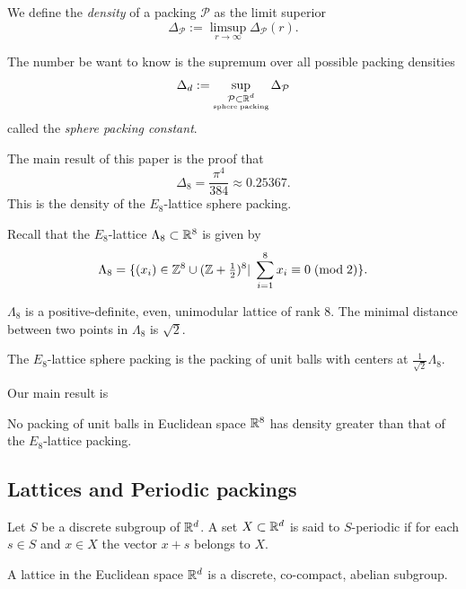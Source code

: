   \begin{definition} We define the \emph{density} of a packing $\mathcal{P}$ as the limit superior
  $$\Delta_{\mathcal{P}}:=\limsup\limits_{r\to\infty}\Delta_{\mathcal{P}}(r). $$
  \end{definition}

  \begin{definition}
  The number be want to know is the supremum over all possible packing densities
  $$\Delta_d:=\sup\limits_{\substack{\mathcal{P}\subset\mathbb{R}^d\\ \scriptscriptstyle\mathrm{sphere}\;\mathrm{packing}}}\Delta_{\mathcal{P}} $$
  called the \emph{sphere packing constant}.
  \end{definition}

  The main result of this paper is the proof that $$\Delta_8=\frac{\pi^4}{384}\approx 0.25367.$$
  This is the density of the $E_8$-lattice sphere packing.
  \begin{definition}Recall that the $E_8$-lattice $\Lambda_8\subset\mathbb{R}^8$ is given by
  $$\Lambda_8=\{(x_i)\in\mathbb{Z}^8\cup(\mathbb{Z}+\textstyle\frac12\displaystyle )^8|\;\sum_{i=1}^8x_i\equiv 0\;(\mathrm{mod\;2})\}.$$
  \end{definition}
  \begin{lemma}$\Lambda_8$ is a positive-definite, even, unimodular lattice of rank 8. The minimal distance between two points in $\Lambda_8$ is $\sqrt{2}$.
  \end{lemma}
  \begin{definition}
  The $E_8$-lattice sphere packing is the packing of unit balls with centers at $\frac{1}{\sqrt{2}}\Lambda_8.$
  \end{definition}
  Our main result is
  \begin{theorem}\label{thm: main}
  No packing of unit balls
  in Euclidean space $\mathbb{R}^8$ has density greater than that of the $E_8$-lattice packing.
  \end{theorem}

  \subsection{Lattices and Periodic packings}
  \begin{definition} Let $S$ be a discrete subgroup of $\mathbb{R}^d$. A set $X\subset\mathbb{R}^d$ is said to $S$-periodic if for each $s\in S$ and $x\in X$ the vector $x+s$ belongs to $X$.
  \end{definition}

  \begin{definition}\label{EuclideanLattice.is_lattice}
    A lattice in the Euclidean space $\mathbb{R}^d$ is a discrete, co-compact, abelian subgroup.
  \end{definition}

